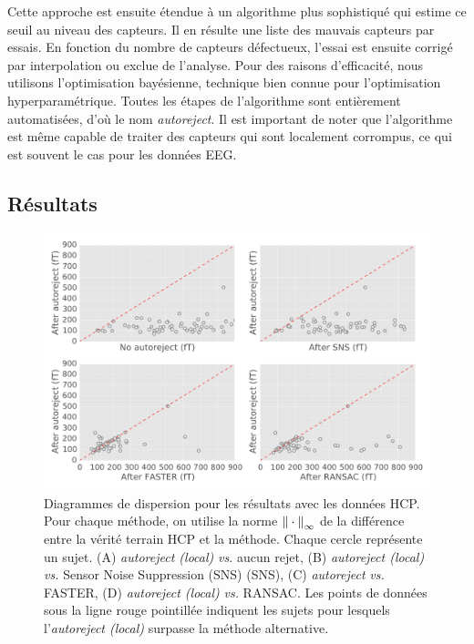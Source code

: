Cette approche est ensuite étendue à un algorithme plus sophistiqué qui estime ce seuil au niveau des capteurs. Il en résulte une liste des mauvais capteurs par essais. En fonction du nombre de capteurs défectueux, l'essai est ensuite corrigé par interpolation ou exclue de l'analyse. Pour des raisons d'efficacité, nous utilisons l'optimisation bayésienne, technique bien connue pour l'optimisation hyperparamétrique. Toutes les étapes de l'algorithme sont entièrement automatisées, d’où le nom \emph{autoreject}. Il est important de noter que l'algorithme est même capable de traiter des capteurs qui sont localement corrompus, ce qui est souvent le cas pour les données EEG.


\subsection*{Résultats}

\begin{figure}[htb]
    \centering
    \includegraphics[width=\linewidth]{figures/figure4.pdf}
    \caption[]{Diagrammes de dispersion pour les résultats avec les données HCP. Pour chaque méthode, on utilise la norme ${\| \cdot \|}_{\mathrm{\infty}}$ de la différence entre la vérité terrain HCP et la méthode. Chaque cercle représente un sujet. (A) \textit{autoreject (local)} \emph{vs.} aucun rejet, (B) \textit{autoreject (local)} \emph{vs.} Sensor Noise Suppression (SNS) (SNS), (C) \textit{autoreject} \emph{vs.} FASTER, (D) \textit{autoreject (local)} \emph{vs.} RANSAC. Les points de données sous la ligne rouge pointillée indiquent les sujets pour lesquels l'\textit{autoreject (local)} surpasse la méthode alternative.}
    \label{fig:sommaire:hcp_scatter}
\end{figure}

